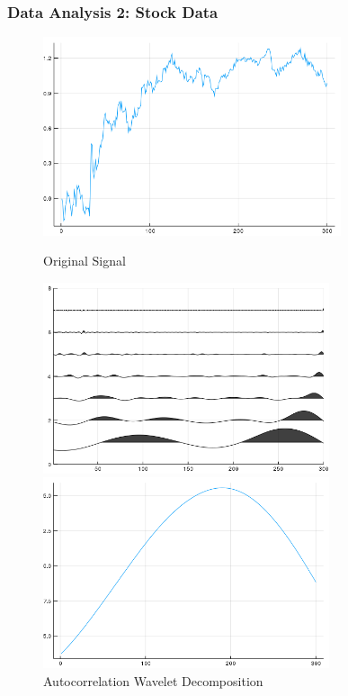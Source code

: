 \documentclass[aspectratio=169]{beamer}
\begin{document}
\begin{frame}
\frametitle{Data Analysis 2: Stock Data}
    \begin{figure}
        \centering
        \includegraphics[height=0.17\textheight,width=0.78\textwidth]{stock_data_full.png}
        \caption{Original Signal}
        \includegraphics[height=0.3\textheight,width=0.75\textwidth]{stock_data.png}
        
        \includegraphics[height=0.15\textheight,width=0.75\textwidth]{stock_base.png}
        \caption{Autocorrelation Wavelet Decomposition}
    \end{figure}
\end{frame}
\end{document}
